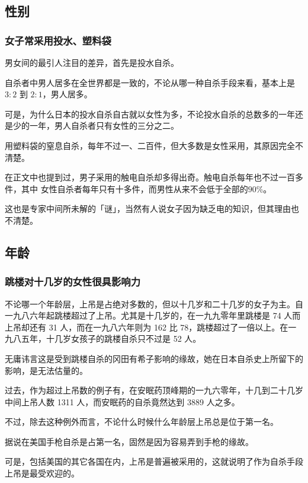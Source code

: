 \documentclass[UTF8]{ctexart}
\begin{document}
\subsection{性别}

\subsubsection*{女子常采用投水、塑料袋}

男女间的最引人注目的差异，首先是投水自杀。

自杀者中男人居多在全世界都是一致的，不论从哪一种自杀手段来看，基本上是 $3:2$ 到 $2:1$，男人居多。

可是，为什么日本的投水自杀自古就以女性为多，不论投水自杀的总数多的一年还是少的一年，男人自杀者只有女性的三分之二。

用塑料袋的窒息自杀，每年不过一、二百件，但大多数是女性采用，其原因完全不清楚。

在正文中也提到过，男子采用的触电自杀却多得出奇。触电自杀每年也不过一百多件，其中 女性自杀者每年只有十多件，而男性从来不会低于全部的$90\%$。

这也是专家中间所未解的「谜」，当然有人说女子因为缺乏电的知识，但其理由也不清楚。

\subsection{年龄}

\subsubsection*{跳楼对十几岁的女性很具影响力}

不论哪一个年龄层，上吊是占绝对多数的，但以十几岁和二十几岁的女子为主。自一九八六年起跳楼超过了上吊。尤其是十几岁的，在一九九零年里跳楼是 74 人而上吊却还有 31 人，而在一九八六年则为 162 比 78，跳楼超过了一倍以上。在一九八五年，十几岁女孩子的跳楼自杀只不过是 52 人。

无庸讳言这是受到跳楼自杀的冈田有希子影响的缘故，她在日本自杀史上所留下的影响，是无法估量的。

过去，作为超过上吊数的例子有，在安眠药顶峰期的一九六零年，十几到二十几岁中间上吊人数 1311 人，而安眠药的自杀竟然达到 3889 人之多。

不过，除去这种例外而言，不论什么时候什么年龄层上吊总是位于第一名。

据说在美国手枪自杀是占第一名，固然是因为容易弄到手枪的缘故。

可是，包括美国的其它各国在内，上吊是普遍被采用的，这就说明了作为自杀手段上吊是最受欢迎的。
\end{document}
